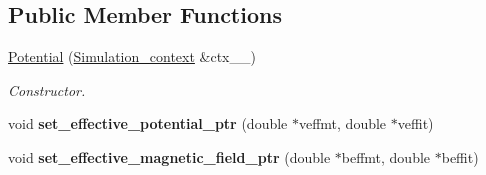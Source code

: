 \subsection*{Public Member Functions}
\begin{DoxyCompactItemize}
\item 
\hyperlink{classsirius_1_1_potential_a8d779e124012d2eb74e622b91774c2ea}{Potential} (\hyperlink{classsirius_1_1_simulation__context}{Simulation\+\_\+context} \&ctx\+\_\+\+\_\+)
\begin{DoxyCompactList}\small\item\em Constructor. \end{DoxyCompactList}\item 
\hypertarget{classsirius_1_1_potential_aeb014b9a7c5ecc5f79ba84bb99e9abc1}{}void {\bfseries set\+\_\+effective\+\_\+potential\+\_\+ptr} (double $\ast$veffmt, double $\ast$veffit)\label{classsirius_1_1_potential_aeb014b9a7c5ecc5f79ba84bb99e9abc1}

\item 
\hypertarget{classsirius_1_1_potential_ae936ac0b1e58bc928671b147aea2cf8a}{}void {\bfseries set\+\_\+effective\+\_\+magnetic\+\_\+field\+\_\+ptr} (double $\ast$beffmt, double $\ast$beffit)\label{classsirius_1_1_potential_ae936ac0b1e58bc928671b147aea2cf8a}


\end{DoxyCompactItemize}
